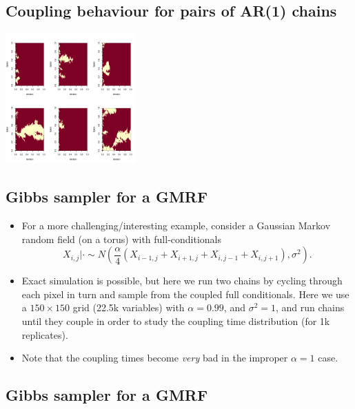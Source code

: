\documentclass[11pt,a4paper]{article}
\begin{document}
  \subsection{Coupling behaviour for pairs of AR(1) chains}
\centerline{\includegraphics[height=5cm]{figs/ar1-coupled-6}}




  \subsection{Gibbs sampler for a GMRF}
  \begin{itemize}
  \item For a more challenging/interesting example, consider a Gaussian Markov random field (on a torus) with full-conditionals
    \[
X_{i,j}|\cdot \sim N\left(\frac{\alpha}{4}(X_{i-1,j}+X_{i+1,j}+X_{i,j-1}+X_{i,j+1}), \sigma^2 \right).
\]
\item Exact simulation is possible, but here we run two chains by cycling through each pixel in turn and sample from the coupled full conditionals. Here we use a $150\times 150$ grid (22.5k variables) with  $\alpha=0.99$, and $\sigma^2=1$, and run chains until they couple in order to study the coupling time distribution (for 1k replicates).
  \item Note that the coupling times become \emph{very} bad in the improper $\alpha=1$ case.
  \end{itemize}


  \subsection{Gibbs sampler for a GMRF}
\end{document}
